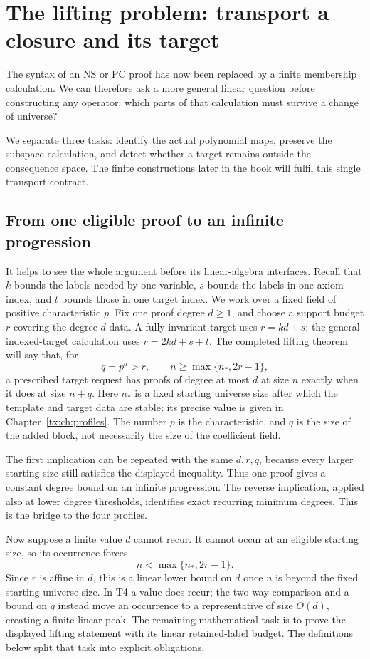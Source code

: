 \chapter{The lifting problem: transport a closure and its target}
\label{tx:chap:contract}
The syntax of an NS or PC proof has now been replaced by a finite
membership calculation. We can therefore ask a more general linear
question before constructing any operator: which parts of that calculation
must survive a change of universe?

We separate three tasks: identify the actual polynomial maps, preserve
the subspace calculation, and detect whether a target remains outside
the consequence space. The finite constructions later in the book
will fulfil this single transport contract.

\section{From one eligible proof to an infinite progression}
It helps to see the whole argument before its linear-algebra interfaces.
Recall that $k$ bounds the labels needed by one variable, $s$ bounds
the labels in one axiom index, and $t$ bounds those in one target index.
We work over a fixed field of positive characteristic $p$.
Fix one proof degree $d\ge1$, and choose a support budget $r$ covering
the degree-$d$ data. A fully invariant target uses $r=kd+s$; the
general indexed-target calculation uses $r=2kd+s+t$. The completed
lifting theorem will say that, for
\[
 q=p^a>r,\qquad n\ge\max\{n_*,2r-1\},
\]
a prescribed target request has proofs of degree at most $d$ at size
$n$ exactly when it does at size $n+q$.
Here $n_*$ is a fixed starting universe size after which the template and target
data are stable; its precise value is given in
Chapter~\ref{tx:ch:profiles}. The number $p$ is the characteristic,
and $q$ is the size of the added block, not necessarily the size of
the coefficient field.

The first implication can be repeated with the same $d,r,q$, because
every larger starting size still satisfies the displayed inequality.
Thus one proof gives a constant degree bound on an infinite
progression. The reverse implication, applied also at lower degree
thresholds, identifies exact recurring minimum degrees. This is the
bridge to the four profiles.

Now suppose a finite value $d$ cannot recur. It cannot occur at an
eligible starting size, so its occurrence forces
\[
                    n<\max\{n_*,2r-1\}.
\]
Since $r$ is affine in $d$, this is a linear lower bound on $d$ once
$n$ is beyond the fixed starting universe size. In T4 a value does recur; the
two-way comparison and a bound on $q$ instead move an occurrence to
a representative of size $O(d)$, creating a finite linear peak.
The remaining mathematical task is to prove the displayed lifting
statement with its linear retained-label budget. The definitions below
split that task into explicit obligations.

